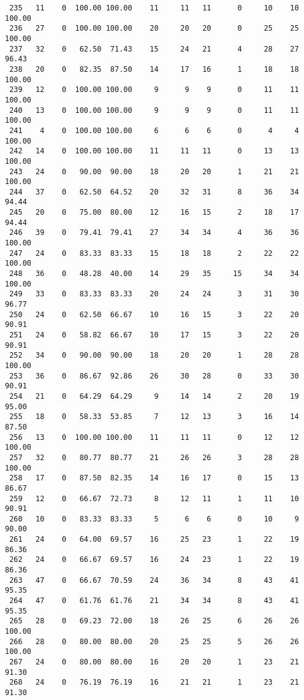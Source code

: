 \begin{verbatim}
 235   11    0  100.00 100.00    11     11   11      0     10    10   100.00
 236   27    0  100.00 100.00    20     20   20      0     25    25   100.00
 237   32    0   62.50  71.43    15     24   21      4     28    27    96.43
 238   20    0   82.35  87.50    14     17   16      1     18    18   100.00
 239   12    0  100.00 100.00     9      9    9      0     11    11   100.00
 240   13    0  100.00 100.00     9      9    9      0     11    11   100.00
 241    4    0  100.00 100.00     6      6    6      0      4     4   100.00
 242   14    0  100.00 100.00    11     11   11      0     13    13   100.00
 243   24    0   90.00  90.00    18     20   20      1     21    21   100.00
 244   37    0   62.50  64.52    20     32   31      8     36    34    94.44
 245   20    0   75.00  80.00    12     16   15      2     18    17    94.44
 246   39    0   79.41  79.41    27     34   34      4     36    36   100.00
 247   24    0   83.33  83.33    15     18   18      2     22    22   100.00
 248   36    0   48.28  40.00    14     29   35     15     34    34   100.00
 249   33    0   83.33  83.33    20     24   24      3     31    30    96.77
 250   24    0   62.50  66.67    10     16   15      3     22    20    90.91
 251   24    0   58.82  66.67    10     17   15      3     22    20    90.91
 252   34    0   90.00  90.00    18     20   20      1     28    28   100.00
 253   36    0   86.67  92.86    26     30   28      0     33    30    90.91
 254   21    0   64.29  64.29     9     14   14      2     20    19    95.00
 255   18    0   58.33  53.85     7     12   13      3     16    14    87.50
 256   13    0  100.00 100.00    11     11   11      0     12    12   100.00
 257   32    0   80.77  80.77    21     26   26      3     28    28   100.00
 258   17    0   87.50  82.35    14     16   17      0     15    13    86.67
 259   12    0   66.67  72.73     8     12   11      1     11    10    90.91
 260   10    0   83.33  83.33     5      6    6      0     10     9    90.00
 261   24    0   64.00  69.57    16     25   23      1     22    19    86.36
 262   24    0   66.67  69.57    16     24   23      1     22    19    86.36
 263   47    0   66.67  70.59    24     36   34      8     43    41    95.35
 264   47    0   61.76  61.76    21     34   34      8     43    41    95.35
 265   28    0   69.23  72.00    18     26   25      6     26    26   100.00
 266   28    0   80.00  80.00    20     25   25      5     26    26   100.00
 267   24    0   80.00  80.00    16     20   20      1     23    21    91.30
 268   24    0   76.19  76.19    16     21   21      1     23    21    91.30

\end{verbatim}
